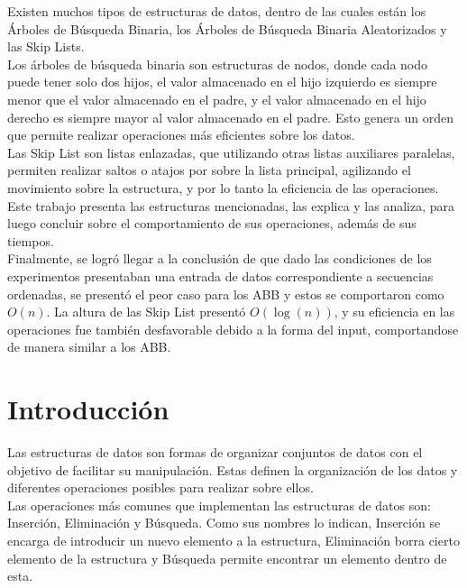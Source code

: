 \documentclass[11pt,letterpaper]{article}
\begin{document}
Existen muchos tipos de estructuras de datos, dentro de las cuales están los Árboles de Búsqueda Binaria, los Árboles de Búsqueda Binaria Aleatorizados y las Skip Lists.\\

Los árboles de búsqueda binaria son estructuras de nodos, donde cada nodo puede tener solo dos hijos, el valor almacenado en el hijo izquierdo es siempre menor que el valor almacenado en el padre, y el valor almacenado en el hijo derecho es siempre mayor al valor almacenado en el padre. Esto genera un orden que permite realizar operaciones más eficientes sobre los datos.\\

Las Skip List son listas enlazadas, que utilizando otras listas auxiliares paralelas, permiten realizar saltos o atajos por sobre la lista principal, agilizando el movimiento sobre la estructura, y por lo tanto la eficiencia de las operaciones.\\

Este trabajo presenta las estructuras mencionadas, las explica y las analiza, para luego concluir sobre el comportamiento de sus operaciones, además de sus tiempos.\\

Finalmente, se logró llegar a la conclusión de que dado las condiciones de los experimentos presentaban una entrada de datos correspondiente a secuencias ordenadas, se presentó el peor caso para los ABB y estos se comportaron como $O(n)$. La altura de las Skip List presentó $O(\log(n))$, y su eficiencia en las operaciones fue también desfavorable debido a la forma del input, comportandose de manera similar a los ABB.

\newpage
\section{Introducción}

Las estructuras de datos son formas de organizar conjuntos de datos con el objetivo de facilitar su manipulación. Estas definen la organización de los datos y diferentes operaciones posibles para realizar sobre ellos.\\
Las operaciones más comunes que implementan las estructuras de datos son: Inserción, Eliminación y Búsqueda. Como sus nombres lo indican, Inserción se encarga de introducir un nuevo elemento a la estructura, Eliminación borra cierto elemento de la estructura y Búsqueda permite encontrar un elemento dentro de esta.\\
\end{document}
